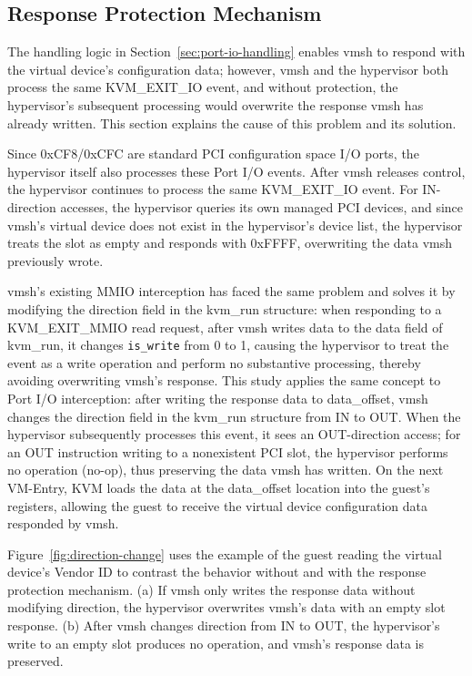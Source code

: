 \begin{ZhChapter}
\subsection{Response Protection Mechanism}
\label{sec:response-protection}

The handling logic in Section~\ref{sec:port-io-handling} enables vmsh to respond with the virtual device's configuration data; however, vmsh and the hypervisor both process the same KVM\_EXIT\_IO event, and without protection, the hypervisor's subsequent processing would overwrite the response vmsh has already written. This section explains the cause of this problem and its solution.

Since 0xCF8/0xCFC are standard PCI configuration space I/O ports, the hypervisor itself also processes these Port I/O events. After vmsh releases control, the hypervisor continues to process the same KVM\_EXIT\_IO event. For IN-direction accesses, the hypervisor queries its own managed PCI devices, and since vmsh's virtual device does not exist in the hypervisor's device list, the hypervisor treats the slot as empty and responds with 0xFFFF, overwriting the data vmsh previously wrote.

\begin{sloppypar}
vmsh's existing MMIO interception has faced the same problem and solves it by modifying the direction field in the kvm\_run structure: when responding to a KVM\_EXIT\_MMIO read request, after vmsh writes data to the data field of kvm\_run, it changes \texttt{is\_write} from 0 to 1, causing the hypervisor to treat the event as a write operation and perform no substantive processing, thereby avoiding overwriting vmsh's response. This study applies the same concept to Port I/O interception: after writing the response data to data\_offset, vmsh changes the direction field in the kvm\_run structure from IN to OUT. When the hypervisor subsequently processes this event, it sees an OUT-direction access; for an OUT instruction writing to a nonexistent PCI slot, the hypervisor performs no operation (no-op), thus preserving the data vmsh has written. On the next VM-Entry, KVM loads the data at the data\_offset location into the guest's registers, allowing the guest to receive the virtual device configuration data responded by vmsh.
\end{sloppypar}

Figure~\ref{fig:direction-change} uses the example of the guest reading the virtual device's Vendor ID to contrast the behavior without and with the response protection mechanism. (a) If vmsh only writes the response data without modifying direction, the hypervisor overwrites vmsh's data with an empty slot response. (b) After vmsh changes direction from IN to OUT, the hypervisor's write to an empty slot produces no operation, and vmsh's response data is preserved.
\newpage


\end{ZhChapter}
